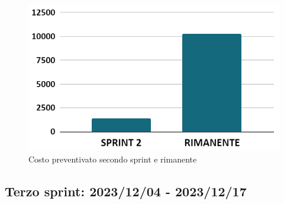 \begin{figure}[h!]
    \centering
    \includegraphics[width=\textwidth]{prev2costo.png}
    \caption{Costo preventivato secondo sprint e rimanente}
    \label{fig:preventivocostosecondosprint}
\end{figure}


\newpage
\subsection{Terzo sprint: 2023/12/04 - 2023/12/17}
